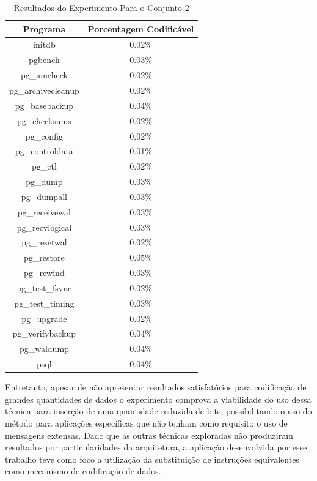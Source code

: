 \begin{table}[htb]
    \centering
    
    \begin{tabular}{|c|c|}
        \hline
        Programa & Porcentagem Codificável \\
        \hline
        initdb & 0.02\% \\
        \hline
        pgbench & 0.03\% \\
        \hline
        pg\_amcheck & 0.02\% \\
        \hline
        pg\_archivecleanup & 0.02\% \\
        \hline
        pg\_basebackup & 0.04\% \\
        \hline
        pg\_checksums & 0.02\% \\
        \hline
        pg\_config & 0.02\% \\
        \hline
        pg\_controldata & 0.01\% \\
        \hline
        pg\_ctl & 0.02\% \\
        \hline
        pg\_dump & 0.03\% \\
        \hline
        pg\_dumpall & 0.03\% \\
        \hline
        pg\_receivewal & 0.03\% \\
        \hline
        pg\_recvlogical & 0.03\% \\
        \hline
        pg\_resetwal & 0.02\% \\
        \hline
        pg\_restore & 0.05\% \\
        \hline
        pg\_rewind & 0.03\% \\
        \hline
        pg\_test\_fsync & 0.02\% \\
        \hline
        pg\_test\_timing & 0.03\% \\
        \hline
        pg\_upgrade & 0.02\% \\
        \hline
        pg\_verifybackup & 0.04\% \\
        \hline
        pg\_waldump & 0.04\% \\
        \hline
        psql & 0.04\% \\
        \hline
    \end{tabular}
    \caption{Resultados do Experimento Para o Conjunto 2}
    \label{tab:exp2_2}
\end{table}

Entretanto, apesar de não apresentar resultados satisfatórios para codificação de grandes quantidades de dados o experimento comprova a viabilidade do uso dessa técnica para inserção de uma quantidade reduzida de bits, possibilitando o uso do método para aplicações específicas que não tenham como requisito o uso de mensagens extensas. Dado que as outras técnicas exploradas não produziram resultados por particularidades da arquitetura, a aplicação desenvolvida por esse trabalho teve como foco a utilização da substituição de instruções equivalentes como mecanismo de codificação de dados.